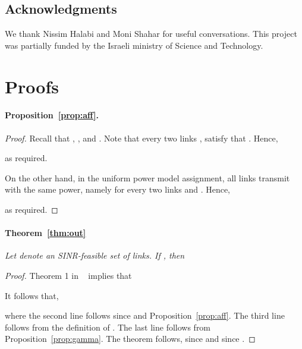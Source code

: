 \documentclass[11pt]{article}
\newenvironment{proof sketch}{\noindent {\bf Proof sketch:} }{\hfill \qed}
\begin{document}
\subsection*{Acknowledgments}
We thank Nissim Halabi and Moni Shahar for useful conversations.
This project was partially funded by the Israeli ministry of Science and Technology.

\begin{comment}
\begin{verbatim}

online

Different beta
close to linear powers
beta < 1

Euclidian

Integrality issues
\end{verbatim}
\end{comment}




\appendix
\section{Proofs}\label{sec:proofs}

\paragraph{Proposition~\ref{prop:aff}.}
 
    

\begin{proof}
    Recall that , , and
    .
    Note that every two links , satisfy that .
    Hence,
    
    as required.

    On the other hand, in the uniform power model assignment, all links transmit with the
    same power, namely  for every two links  and . Hence,
    
    as required.
\end{proof}

\paragraph{Theorem~\ref{thm:out}}
    \textit{Let  denote an SINR-feasible set of links. If , then
     }
\begin{proof}
    Theorem 1 in ~\cite{K10} implies that
    
    It follows that,
    
    where the second line follows since  and Proposition~\ref{prop:aff}. The third line follows from the definition of . The last line follows from Proposition~\ref{prop:gamma}.
    The theorem follows, since  and since .
\end{proof}
\end{document}
